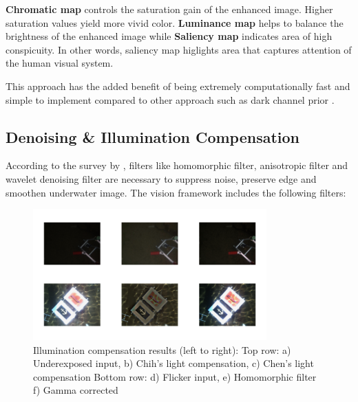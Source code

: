 \documentclass[fypca]{socreport}
\begin{document}
\textbf{Chromatic map} controls the saturation gain of the enhanced image.
Higher saturation values yield more vivid color. \textbf{Luminance map} helps to
balance the brightness of the enhanced image while \textbf{Saliency map}
indicates area of high conspicuity. In other words, saliency map higlights area
that captures attention of the human visual system.

This approach has the added benefit of being extremely computationally fast and
simple to implement compared to other approach such as dark channel prior .

\subsection{Denoising \& Illumination Compensation}

According to the survey by , filters like
homomorphic filter, anisotropic filter and wavelet denoising filter are
necessary to suppress noise, preserve edge and smoothen underwater image. The
vision framework includes the following filters:

\begin{figure}[H]
\centering
  \includegraphics[width=0.8\textwidth, height=0.3\textheight]{illumination_compensation.png}
  \caption{Illumination compensation results (left to right): \newline Top row:
  a) Underexposed input, b) Chih's light compensation, c) Chen's light compensation \newline Bottom
  row: d) Flicker input, e) Homomorphic filter f) Gamma corrected}
  \label{fig:illumination_compensation_results}
\end{figure}
\end{document}
